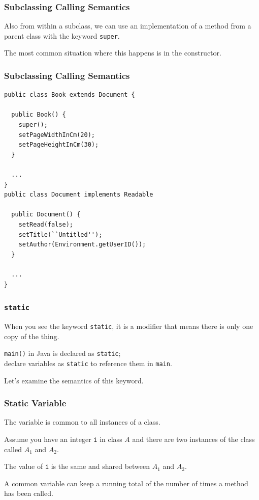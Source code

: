 \begin{frame}
\frametitle{Subclassing Calling Semantics}
\begin{changemargin}{1cm}

Also from within a subclass, we can use an implementation of a method from a parent class with the keyword \texttt{super}.

The most common situation where this happens is in the constructor. 
\end{changemargin}
\end{frame}

\begin{frame}[fragile]
\frametitle{Subclassing Calling Semantics}
\begin{changemargin}{1cm}
{\scriptsize
\begin{verbatim}
public class Book extends Document {

  public Book() {
    super();
    setPageWidthInCm(20);
    setPageHeightInCm(30);
  }
  
  ...
}
public class Document implements Readable

  public Document() {
    setRead(false);
    setTitle(``Untitled'');
    setAuthor(Environment.getUserID());
  }
  
  ...
}
\end{verbatim}
}
\end{changemargin}
\end{frame}


\begin{frame}
\frametitle{\texttt{static}}
\begin{changemargin}{1cm}
When you see the keyword \texttt{static}, it is a modifier that means there is only one copy of the thing. 

\texttt{main()} in Java is declared as \texttt{static}; \\
\quad declare variables as \texttt{static} to reference them in \texttt{main}. 

Let's examine the semantics of this keyword.
\end{changemargin}
\end{frame}

\begin{frame}
\frametitle{Static Variable}
\begin{changemargin}{1cm}

The variable is common to all instances of a class. 

Assume you have an integer \texttt{i} in class $A$ and there are two instances of the class called $A_{1}$ and $A_{2}$. 

The value of \texttt{i} is the same and shared between $A_{1}$ and $A_{2}$.

A common variable can  keep a running total of the number of times a method has been called.
\end{changemargin}
\end{frame}

